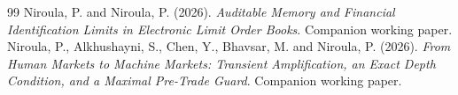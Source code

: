 \documentclass[11pt]{article}
\theoremstyle{definition}
\theoremstyle{remark}
\begin{document}
\begin{thebibliography}{99}
 Niroula, P. and Niroula, P. (2026). \emph{Auditable Memory and Financial Identification Limits in Electronic Limit Order Books}. Companion working paper.
 Niroula, P., Alkhushayni, S., Chen, Y., Bhavsar, M. and Niroula, P. (2026). \emph{From Human Markets to Machine Markets: Transient Amplification, an Exact Depth Condition, and a Maximal Pre-Trade Guard}. Companion working paper.
\end{thebibliography}
\end{document}

